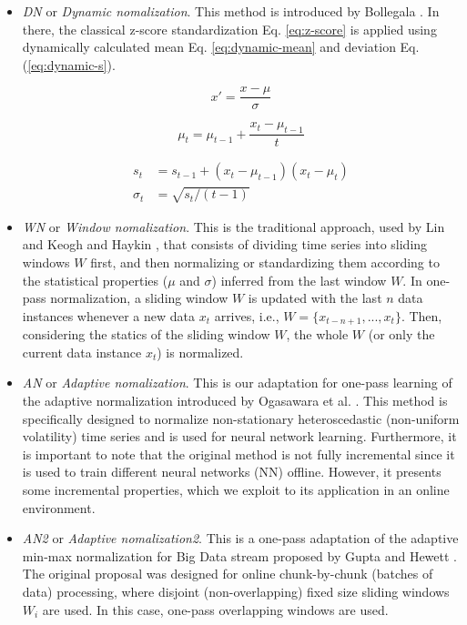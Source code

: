 \documentclass[a4paper]{article}\usepackage[]{graphicx}\usepackage[]{color}
\begin{document}
\begin{itemize}

\item \emph{DN} or \emph{Dynamic nomalization}. This method is introduced by Bollegala \cite{Bollegala2017}. In there, the classical z-score standardization Eq. \eqref{eq:z-score} is applied using dynamically calculated mean Eq. \eqref{eq:dynamic-mean} and deviation Eq. (\ref{eq:dynamic-s}).

\begin{equation}\label{eq:z-score}
    x' = \frac{x - \mu}{\sigma}
\end{equation}

\begin{equation} \label{eq:dynamic-mean}
    \mu_{t} = \mu_{t-1} + \frac{x_{t} - \mu_{t-1}}{t}
\end{equation}

\begin{equation} \begin{aligned} \label{eq:dynamic-s}
    s_{t} &= s_{t-1} + (x_{t} - \mu_{t-1})(x_{t} - \mu_{t}) \\
    \sigma_{t} &= \sqrt{s_{t} / (t-1)}
\end{aligned} \end{equation}

\item \emph{WN} or \emph{Window nomalization}. This is the traditional approach, used by  Lin and Keogh \cite{Lin2004} and Haykin  \cite{haykin2009neural}, that consists of dividing time series into sliding windows $W$ first, and then normalizing or standardizing them according to the statistical properties ($\mu$ and $\sigma$) inferred from the last window $W$. In one-pass normalization, a sliding window $W$ is updated with the last $n$ data instances whenever a new data $x_{t}$ arrives, i.e.,  $W = \{x_{t-n+1}, ..., x_{t}\}$. Then, considering the statics of the sliding window $W$, the whole $W$ (or only the current data instance $x_{t}$) is normalized.

\item \emph{AN} or \emph{Adaptive nomalization}. This is our adaptation for one-pass learning of the adaptive normalization introduced by Ogasawara et al. \cite{Ogasawara2010}. This method is specifically designed to normalize non-stationary heteroscedastic (non-uniform volatility) time series and is used for neural network learning. Furthermore, it is important to note that the original method is not fully incremental since it is used to train different neural networks (NN) offline. However, it presents some incremental properties, which we exploit to its application in an online environment.

\item \emph{AN2} or \emph{Adaptive nomalization2}. This is a one-pass adaptation of the adaptive min-max normalization for Big Data stream proposed by Gupta and Hewett \cite{Gupta2019}. The original proposal was designed for online chunk-by-chunk (batches of data) processing, where disjoint (non-overlapping) fixed size sliding windows $W_{i}$ are used. In this case, one-pass overlapping windows are used.

\end{itemize}
\end{document}

